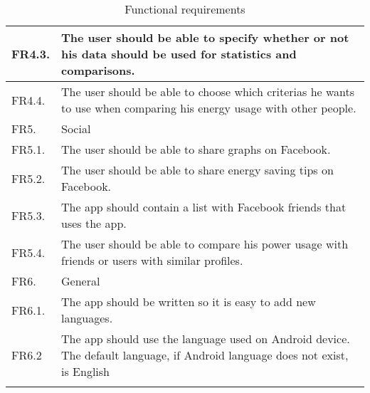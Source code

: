 \begin{longtable}{|l|p{14.5cm}|}
FR4.3. &The user should be able to specify whether or not his data should be used for statistics and comparisons.\\\hline
FR4.4.& The user should be able to choose which criterias he wants to use when comparing his energy usage with other people.\\\hline
\cellcolor{lightgray}FR5.& \cellcolor{lightgray}Social\\\hline
FR5.1. &The user should be able to share graphs on Facebook.\\\hline
FR5.2. &The user should be able to share energy saving tips on Facebook.\\\hline
FR5.3.& The app should contain a list with Facebook friends that uses the app.\\\hline
FR5.4.& The user should be able to compare his power usage with friends or users with similar profiles.\\\hline
\cellcolor{lightgray}FR6.& \cellcolor{lightgray}General\\\hline
FR6.1. & The app should be written so it is easy to add new languages.\\\hline FR6.2 & The app should use the language used on Android device. The default language, if Android language does not exist, is English\\\hline
\caption{Functional requirements}
\label{tab:funcReq}
\end{longtable} 
